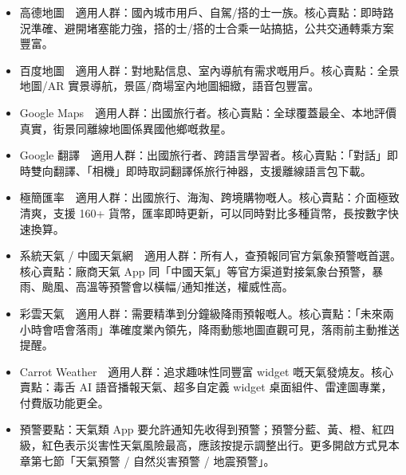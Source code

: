 
\begin{itemize}
  \item 高德地圖　適用人群：國內城市用戶、自駕/搭的士一族。核心賣點：即時路況準確、避開堵塞能力強，搭的士/搭的士合乘一站搞掂，公共交通轉乘方案豐富。
  \item 百度地圖　適用人群：對地點信息、室內導航有需求嘅用戶。核心賣點：全景地圖/AR 實景導航，景區/商場室內地圖細緻，語音包豐富。
  \item Google Maps　適用人群：出國旅行者。核心賣點：全球覆蓋最全、本地評價真實，街景同離線地圖係異國他鄉嘅救星。
\end{itemize}


\begin{itemize}
  \item Google 翻譯　適用人群：出國旅行者、跨語言學習者。核心賣點：「對話」即時雙向翻譯、「相機」即時取詞翻譯係旅行神器，支援離線語言包下載。
\end{itemize}


\begin{itemize}
  \item 極簡匯率　適用人群：出國旅行、海淘、跨境購物嘅人。核心賣點：介面極致清爽，支援 160+ 貨幣，匯率即時更新，可以同時對比多種貨幣，長按數字快速換算。
\end{itemize}


\begin{itemize}
  \item 系統天氣 / 中國天氣網　適用人群：所有人，查預報同官方氣象預警嘅首選。核心賣點：廠商天氣 App 同「中國天氣」等官方渠道對接氣象台預警，暴雨、颱風、高溫等預警會以橫幅/通知推送，權威性高。
  \item 彩雲天氣　適用人群：需要精準到分鐘級降雨預報嘅人。核心賣點：「未來兩小時會唔會落雨」準確度業內領先，降雨動態地圖直觀可見，落雨前主動推送提醒。
  \item Carrot Weather　適用人群：追求趣味性同豐富 widget 嘅天氣發燒友。核心賣點：毒舌 AI 語音播報天氣、超多自定義 widget 桌面組件、雷達圖專業，付費版功能更全。
  \item 預警要點：天氣類 App 要允許通知先收得到預警；預警分藍、黃、橙、紅四級，紅色表示災害性天氣風險最高，應該按提示調整出行。更多開啟方式見本章第七節「天氣預警 / 自然災害預警 / 地震預警」。
\end{itemize}

